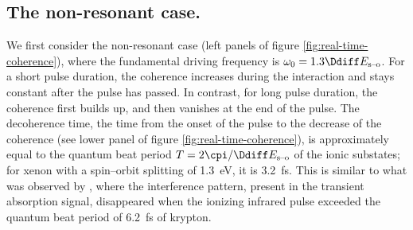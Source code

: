 \subsection{The non-resonant case.}
\label{sec:bichromatic-non-resonant}
We first consider the non-resonant case (left panels of figure
\ref{fig:real-time-coherence}), where the fundamental driving
frequency is \(\omega_0=1.3\Ddiff E_{\textrm{s--o}}\). For a short pulse
duration, the coherence increases during the interaction and stays
constant after the pulse has passed. In contrast, for long pulse
duration, the coherence first builds up, and then vanishes at the end
of the pulse. The decoherence time, \ie the time from the onset of the
pulse to the decrease of the coherence (see lower panel of figure
\ref{fig:real-time-coherence}), is approximately equal to the quantum
beat period \(T=2\cpi/\Ddiff E_{\textrm{s--o}}\) of the ionic
substates; for xenon with a spin--orbit splitting of
\SI{1.3}{\electronvolt}, it is \SI{3.2}{\femto\second}. This is
similar to what was observed by \textcite{Goulielmakis2010}, where the
interference pattern, present in the transient absorption signal,
disappeared when the ionizing infrared pulse exceeded the quantum beat
period of \SI{6.2}{\femto\second} of krypton.

